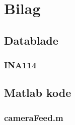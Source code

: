 \chapter{Bilag}
\section{Datablade}
\subsection{INA114}
\section{Matlab kode}
\subsection{cameraFeed.m}